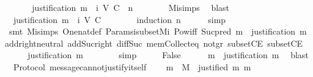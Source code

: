 \begin{isabellebody}
\ \ \isamarkupfalse%
\ \isamarkupfalse%
\ \ {\isachardoublequoteopen}justification\ m\ {\isasymin}\ {\isasymSigma}i\ {\isacharparenleft}V{\isacharcomma}\ C{\isacharcomma}\ {\isasymepsilon}{\isacharparenright}\ {\isacharparenleft}n\ {\isacharminus}\ {}{\isacharparenright}{\isachardoublequoteclose}\isanewline
\ \ \ \ \isamarkupfalse%
\ Mi{\isachardot}simps\ \isamarkupfalse%
\ blast\isanewline
\ \ \isamarkupfalse%
\ \isamarkupfalse%
\ \ {\isachardoublequoteopen}justification\ m\ {\isasymin}\ {\isasymSigma}i\ {\isacharparenleft}V{\isacharcomma}\ C{\isacharcomma}\ {\isasymepsilon}{\isacharparenright}\ {}{\isachardoublequoteclose}\isanewline
\ \ \ \ \isamarkupfalse%
\ {\isacharparenleft}induction\ n{\isacharparenright}\isanewline
\ \ \ \ \isamarkupfalse%
\ simp\isanewline
\ \ \ \ \isamarkupfalse%
\ {\isacharparenleft}smt\ Mi{\isachardot}simps\ One{\isacharunderscore}nat{\isacharunderscore}def\ Params{\isachardot}{\isasymSigma}i{\isacharunderscore}subset{\isacharunderscore}Mi\ Pow{\isacharunderscore}iff\ Suc{\isacharunderscore}pred\ {\isacartoucheopen}m\ {\isasymin}\ justification\ m{\isacartoucheclose}\ add{\isachardot}right{\isacharunderscore}neutral\ add{\isacharunderscore}Suc{\isacharunderscore}right\ diff{\isacharunderscore}Suc{\isacharunderscore}{}\ mem{\isacharunderscore}Collect{\isacharunderscore}eq\ not{\isacharunderscore}gr{}\ subsetCE\ subsetCE{\isacharparenright}\isanewline
\ \ \isamarkupfalse%
\ \isamarkupfalse%
\ {\isachardoublequoteopen}justification\ m\ {\isasymin}\ {\isacharbraceleft}{\isasymemptyset}{\isacharbraceright}{\isachardoublequoteclose}\isanewline
\ \ \ \ \isamarkupfalse%
\ simp\isanewline
\ \ \isamarkupfalse%
\ \isamarkupfalse%
\ False\isanewline
\ \ \ \ \isamarkupfalse%
\ {\isacartoucheopen}m\ {\isasymin}\ justification\ m{\isacartoucheclose}\ \isamarkupfalse%
\ blast\isanewline
{}\isamarkupfalse%
%
\endisatagproof
{\isafoldproof}%
%
\isadelimproof
\isanewline
%
\endisadelimproof
\isanewline
{}\isamarkupfalse%
\ {\isacharparenleft}\ Protocol{\isacharparenright}\ message{\isacharunderscore}cannot{\isacharunderscore}justify{\isacharunderscore}itself\ {\isacharcolon}\isanewline
\ \ {\isachardoublequoteopen}{\isacharparenleft}{\isasymforall}\ m\ {\isasymin}\ M{\isachardot}\ {\isasymnot}\ justified\ m\ m{\isacharparenright}{\isachardoublequoteclose}\isanewline

\end{isabellebody}
